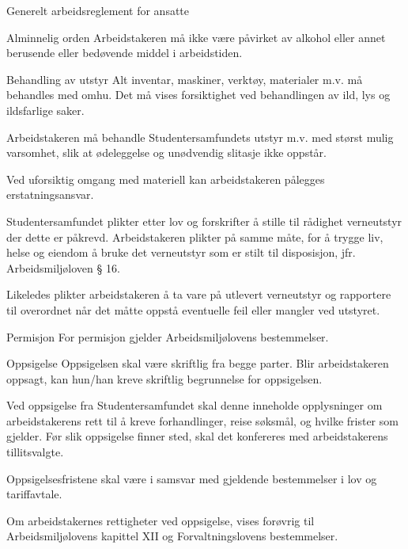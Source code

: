 \begin{lovkapittel}{Generelt arbeidsreglement for ansatte}
\begin{lovparagraf}{Alminnelig orden}
        Arbeidstakeren må ikke være påvirket av alkohol eller annet berusende eller bedøvende middel i arbeidstiden.
    \end{lovparagraf}

    \begin{lovparagraf}{Behandling av utstyr}
        Alt inventar, maskiner, verktøy, materialer m.v. må behandles med omhu. Det må vises forsiktighet ved behandlingen
        av ild, lys og ildsfarlige saker.

        Arbeidstakeren må behandle Studentersamfundets utstyr m.v. med størst mulig varsomhet, slik at ødeleggelse og
        unødvendig slitasje ikke oppstår.

        Ved uforsiktig omgang med materiell kan arbeidstakeren pålegges erstatningsansvar.

        Studentersamfundet plikter etter lov og forskrifter å stille til rådighet verneutstyr der dette er påkrevd. Arbeidstakeren
        plikter på samme måte, for å trygge liv, helse og eiendom å bruke det verneutstyr som er stilt til disposisjon, jfr.
        Arbeidsmiljøloven § 16.

        Likeledes plikter arbeidstakeren å ta vare på utlevert verneutstyr og rapportere til overordnet når det måtte oppstå
        eventuelle feil eller mangler ved utstyret.
    \end{lovparagraf}

    \begin{lovparagraf}{Permisjon}
        For permisjon gjelder Arbeidsmiljølovens bestemmelser.
    \end{lovparagraf}

    \begin{lovparagraf}{Oppsigelse}
        Oppsigelsen skal være skriftlig fra begge parter. Blir arbeidstakeren oppsagt, kan hun/han kreve skriftlig begrunnelse
        for oppsigelsen.

        Ved oppsigelse fra Studentersamfundet skal denne inneholde opplysninger om arbeidstakerens rett til å kreve
        forhandlinger, reise søksmål, og hvilke frister som gjelder. Før slik oppsigelse finner sted, skal det konfereres med
        arbeidstakerens tillitsvalgte.

        Oppsigelsesfristene skal være i samsvar med gjeldende bestemmelser i lov og tariffavtale.

        Om arbeidstakernes rettigheter ved oppsigelse, vises forøvrig til Arbeidsmiljølovens kapittel XII og
        Forvaltningslovens bestemmelser.


\end{lovparagraf}
\end{lovkapittel}
